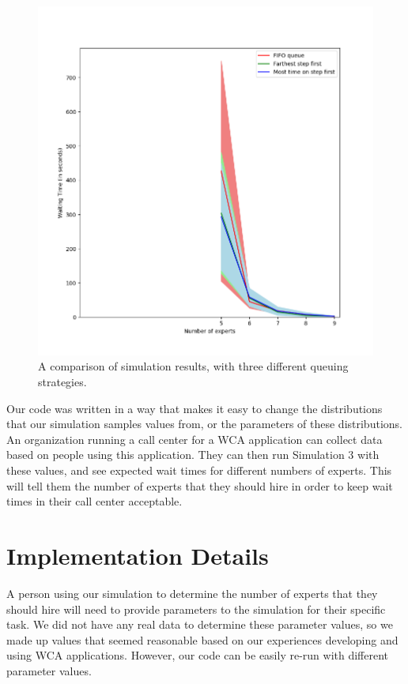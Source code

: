 \begin{figure}[H]
  \includegraphics[width=\textwidth]{figures/montecarlo/full_three_strategies.png}
  \caption{
    A comparison of simulation results, with three different queuing strategies.
  }\label{fig:full_three_strategies}
\end{figure}

Our code was written in a way that makes it easy to change the distributions
that our simulation samples values from, or the parameters of these
distributions.
An organization running a call center for a WCA application can collect data
based on people using this application.
They can then run Simulation 3 with these values, and see expected wait times
for different numbers of experts.
This will tell them the number of experts that they should hire in order to keep
wait times in their call center acceptable.

\section{Implementation Details}

A person using our simulation to determine the number of experts that they
should hire will need to provide parameters to the simulation for their specific
task.
We did not have any real data to determine these parameter values, so we made up
values that seemed reasonable based on our experiences developing and using WCA
applications.
However, our code can be easily re-run with different parameter values.

